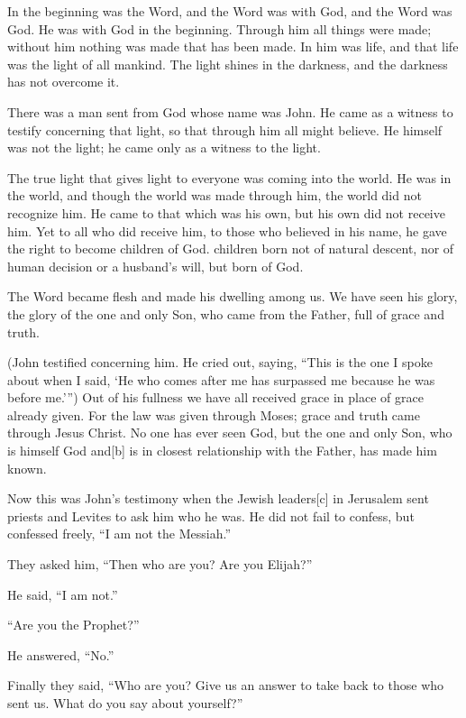 \begin{englishabstract}

 In the beginning was the Word, and the Word was with God, and the Word was God.  He was with God in the beginning.  Through him all things were made; without him nothing was made that has been made. In him was life, and that life was the light of all mankind.  The light shines in the darkness, and the darkness has not overcome it.

 There was a man sent from God whose name was John. He came as a witness to testify concerning that light, so that through him all might believe.  He himself was not the light; he came only as a witness to the light.

 The true light that gives light to everyone was coming into the world.  He was in the world, and though the world was made through him, the world did not recognize him.  He came to that which was his own, but his own did not receive him. Yet to all who did receive him, to those who believed in his name, he gave the right to become children of God. children born not of natural descent, nor of human decision or a husband’s will, but born of God.

The Word became flesh and made his dwelling among us. We have seen his glory, the glory of the one and only Son, who came from the Father, full of grace and truth.

(John testified concerning him. He cried out, saying, “This is the one I spoke about when I said, ‘He who comes after me has surpassed me because he was before me.’”) Out of his fullness we have all received grace in place of grace already given.  For the law was given through Moses; grace and truth came through Jesus Christ.  No one has ever seen God, but the one and only Son, who is himself God and[b] is in closest relationship with the Father, has made him known.

 Now this was John’s testimony when the Jewish leaders[c] in Jerusalem sent priests and Levites to ask him who he was.  He did not fail to confess, but confessed freely, “I am not the Messiah.”

 They asked him, “Then who are you? Are you Elijah?”

He said, “I am not.”

“Are you the Prophet?”

He answered, “No.”

Finally they said, “Who are you? Give us an answer to take back to those who sent us. What do you say about yourself?”


\end{englishabstract}

